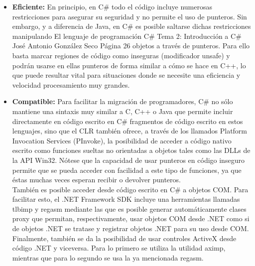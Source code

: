 \begin{itemize}
\begin{itemize}
		\item Si no se considera redefinici\'on, entonces se considera que lo que se desea es ocultar el m\'etodo de la clase padre, de modo que para la clase hija sea como si nunca hubiese existido. El compilador avisar\'a de esta decisi\'on a trav\'es de un mensaje de aviso que puede suprimirse incluyendo el modificador new en la definici\'on del miembro en la clase hija para as\'i indicarle expl\'icitamente la intenci\'on de ocultaci\'on. 
	\end{itemize}

	\item \textbf{Eficiente: } En principio, en C\# todo el c\'odigo incluye numerosas restricciones para asegurar su seguridad y no permite el uso de punteros. Sin embargo, y a diferencia de Java, en C\# es posible saltarse dichas restricciones manipulando El lenguaje de programaci\'on C\# Tema 2: Introducci\'on a C\# Jos\'e Antonio Gonz\'alez Seco P\'agina 26 objetos a trav\'es de punteros. Para ello basta marcar regiones de c\'odigo como inseguras (modificador unsafe) y podr\'an usarse en ellas punteros de forma similar a c\'omo se hace en C++, lo que puede resultar vital para situaciones donde se necesite una eficiencia y velocidad procesamiento muy grandes. 

	\item \textbf{Compatible: } Para facilitar la migraci\'on de programadores, C\# no s\'olo mantiene una sintaxis muy similar a C, C++ o Java que permite incluir directamente en c\'odigo escrito en C\# fragmentos de c\'odigo escrito en estos lenguajes, sino que el CLR tambi\'en ofrece, a trav\'es de los llamados Platform Invocation Services (PInvoke), la posibilidad de acceder a c\'odigo nativo escrito como funciones sueltas no orientadas a objetos tales como las DLLs de la API Win32. N\'otese que la capacidad de usar punteros en c\'odigo inseguro permite que se pueda acceder con facilidad a este tipo de funciones, ya que \'estas muchas veces esperan recibir o devolver punteros.\\

	Tambi\'en es posible acceder desde c\'odigo escrito en C\# a objetos COM. Para facilitar esto, el .NET Framework SDK incluye una herramientas llamadas tlbimp y regasm mediante las que es posible generar autom\'aticamente clases proxy que permitan, respectivamente, usar objetos COM desde .NET como si de objetos .NET se tratase y registrar objetos .NET para su uso desde COM.\\

	Finalmente, tambi\'en se da la posibilidad de usar controles ActiveX desde c\'odigo .NET y viceversa. Para lo primero se utiliza la utilidad aximp, mientras que para lo segundo se usa la ya mencionada regasm.
\end{itemize}







